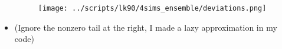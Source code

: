 \documentclass[dvipsnames, 8pt]{beamer}
\begin{document}
\begin{frame}
\begin{columns}
\begin{column}{0.5\textwidth}
\begin{itemize}
                \begin{figure}[h]
                    \centering
                    \texttt{[image: ../scripts/lk90/4sims\_ensemble/deviations.png]}
                \end{figure}

                \item {\small (Ignore the nonzero tail at the right, I made a
                    lazy approximation in my code)}
            \end{itemize}
        \end{column}
    \end{columns}
\end{frame}
\end{document}
